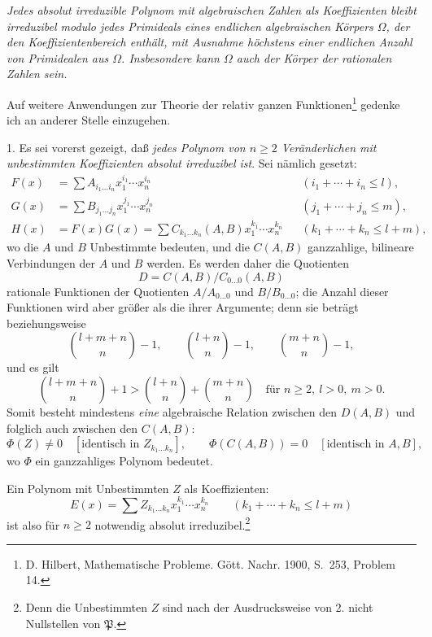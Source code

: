 \documentclass[11pt]{article}
\begin{document}
\emph{Jedes absolut irreduzible Polynom mit algebraischen Zahlen als Koeffizienten bleibt irreduzibel modulo jedes Primideals eines endlichen algebraischen Körpers $\Omega$, der den Koeffizientenbereich enthält, mit Ausnahme höchstens einer endlichen Anzahl von Primidealen aus $\Omega$. Insbesondere kann $\Omega$ auch der Körper der rationalen Zahlen sein.}

Auf weitere Anwendungen zur Theorie der relativ ganzen Funktionen\footnote{D. Hilbert, Mathematische Probleme. Gött. Nachr. 1900, S.~253, Problem 14.} gedenke ich an anderer Stelle einzugehen.

1. Es sei vorerst gezeigt, daß \emph{jedes Polynom von $n\ge2$ Veränderlichen mit unbestimmten Koeffizienten absolut irreduzibel ist}. Sei nämlich gesetzt:
\begin{equation}
\begin{aligned}
F(x)&=\sum A_{i_1\ldots i_n}x_1^{i_1}\cdots x_n^{i_n} &&(i_1+\cdots+i_n\le l),\\
G(x)&=\sum B_{j_1\ldots j_n}x_1^{j_1}\cdots x_n^{j_n} &&(j_1+\cdots+j_n\le m),\\
H(x)&=F(x)G(x)=\sum C_{k_1\ldots k_n}(A,B)x_1^{k_1}\cdots x_n^{k_n} &&(k_1+\cdots+k_n\le l+m),
\end{aligned}
\tag{1}
\end{equation}
wo die $A$ und $B$ Unbestimmte bedeuten, und die $C(A,B)$ ganzzahlige, bilineare Verbindungen der $A$ und $B$ werden. Es werden daher die Quotienten
\[
D=C(A,B)/C_{0\ldots0}(A,B)
\]
rationale Funktionen der Quotienten $A/A_{0\ldots0}$ und $B/B_{0\ldots0}$; die Anzahl dieser Funktionen wird aber größer als die ihrer Argumente; denn sie beträgt beziehungsweise
\[
\binom{l+m+n}{n}-1,
\qquad
\binom{l+n}{n}-1,
\qquad
\binom{m+n}{n}-1,
\]
und es gilt
\[
\binom{l+m+n}{n}+1>
\binom{l+n}{n}+\binom{m+n}{n}
\quad\text{für } n\ge2,\ l>0,\ m>0.
\]
Somit besteht mindestens \emph{eine} algebraische Relation zwischen den $D(A,B)$ und folglich auch zwischen den $C(A,B)$:
\begin{equation}
 \Phi(Z)\ne0\quad[\text{identisch in }Z_{k_1\ldots k_n}],
 \qquad
 \Phi(C(A,B))=0\quad[\text{identisch in }A,B],
\tag{2}
\end{equation}
wo $\Phi$ ein ganzzahliges Polynom bedeutet.

Ein Polynom mit Unbestimmten $Z$ als Koeffizienten:
\begin{equation}
 E(x)=\sum Z_{k_1\ldots k_n}x_1^{k_1}\cdots x_n^{k_n}
 \qquad(k_1+\cdots+k_n\le l+m)
\tag{3}
\end{equation}
ist also für $n\ge2$ notwendig absolut irreduzibel.\footnote{Denn die Unbestimmten $Z$ sind nach der Ausdrucksweise von 2. nicht Nullstellen von $\mathfrak P$.}
\end{document}
